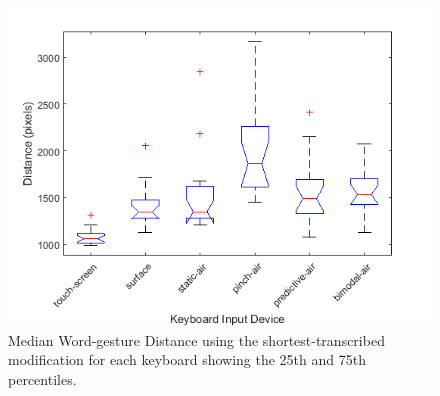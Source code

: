\begin{figure}[t]
	\centering
	\includegraphics{Figures/fig_distance_short_boxplot}
	\caption[Word-gesture Distance Boxplot for Modified-shortest]{Median Word-gesture Distance using the shortest-transcribed modification for each keyboard showing the 25th and 75th percentiles.}
	\label{fig_distance_short_boxplot}
\end{figure}

